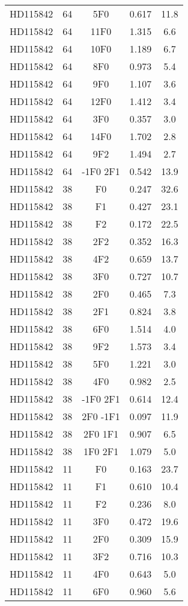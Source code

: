 \begin{table*}
\begin{tabular}{l c c c c}
HD115842 & 64 & 5F0 & 0.617 & 11.8\\ 
HD115842 & 64 & 11F0 & 1.315 & 6.6\\ 
HD115842 & 64 & 10F0 & 1.189 & 6.7\\ 
HD115842 & 64 & 8F0 & 0.973 & 5.4\\ 
HD115842 & 64 & 9F0 & 1.107 & 3.6\\ 
HD115842 & 64 & 12F0 & 1.412 & 3.4\\ 
HD115842 & 64 & 3F0 & 0.357 & 3.0\\ 
HD115842 & 64 & 14F0 & 1.702 & 2.8\\ 
HD115842 & 64 & 9F2 & 1.494 & 2.7\\ 
HD115842 & 64 & -1F0 2F1 & 0.542 & 13.9\\ 
\hline
HD115842 & 38 & F0 & 0.247 & 32.6\\ 
HD115842 & 38 & F1 & 0.427 & 23.1\\ 
HD115842 & 38 & F2 & 0.172 & 22.5\\ 
HD115842 & 38 & 2F2 & 0.352 & 16.3\\ 
HD115842 & 38 & 4F2 & 0.659 & 13.7\\ 
HD115842 & 38 & 3F0 & 0.727 & 10.7\\ 
HD115842 & 38 & 2F0 & 0.465 & 7.3\\ 
HD115842 & 38 & 2F1 & 0.824 & 3.8\\ 
HD115842 & 38 & 6F0 & 1.514 & 4.0\\ 
HD115842 & 38 & 9F2 & 1.573 & 3.4\\ 
HD115842 & 38 & 5F0 & 1.221 & 3.0\\ 
HD115842 & 38 & 4F0 & 0.982 & 2.5\\ 
HD115842 & 38 & -1F0 2F1 & 0.614 & 12.4\\ 
HD115842 & 38 & 2F0 -1F1 & 0.097 & 11.9\\ 
HD115842 & 38 & 2F0 1F1 & 0.907 & 6.5\\ 
HD115842 & 38 & 1F0 2F1 & 1.079 & 5.0\\ 
\hline
HD115842 & 11 & F0 & 0.163 & 23.7\\ 
HD115842 & 11 & F1 & 0.610 & 10.4\\ 
HD115842 & 11 & F2 & 0.236 & 8.0\\ 
HD115842 & 11 & 3F0 & 0.472 & 19.6\\ 
HD115842 & 11 & 2F0 & 0.309 & 15.9\\ 
HD115842 & 11 & 3F2 & 0.716 & 10.3\\ 
HD115842 & 11 & 4F0 & 0.643 & 5.0\\ 
HD115842 & 11 & 6F0 & 0.960 & 5.6\\ 

\end{tabular}
\end{table*}
